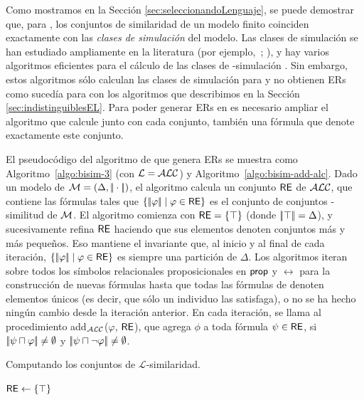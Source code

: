 Como mostramos en la Secci\'on \ref{sec:seleccionandoLenguaje}, se puede demostrar que, para \ALC, los conjuntos de similaridad de un modelo finito
coinciden exactamente con las \emph{clases de simulaci\'on} del modelo. Las
clases de simulaci\'on se han estudiado ampliamente en la literatura
(por ejemplo,~\cite{BRV01}; \cite {Kurt:expr99}), y hay varios
algoritmos eficientes para el c\'alculo de las clases de \alc-simulaci\'on
\cite{hopc:algo71,paig:thre87,dovier04:_effic_algor_for_comput_bisim_equiv}.
Sin embargo, estos algoritmos s\'olo calculan las clases de simulaci\'on para \alc y no obtienen ERs como suced\'ia para \EL con los algoritmos que describimos en la Secci\'on \ref{sec:indistinguiblesEL}. Para poder generar ERs en \alc es necesario ampliar el algoritmo \cite{hopc:algo71} que
calcule junto con cada conjunto, tambi\'en una f\'ormula que denote
exactamente este conjunto.
 
El pseudoc\'odigo del algoritmo de \ALC que genera ERs se muestra como
Algoritmo~\ref{algo:bisim-3} (con $\mathcal{L}=\mathcal{ALC}$) y
Algoritmo~\ref{algo:bisim-add-alc}. Dado un modelo de $\mathcal{M}=(\Delta,
|\!|\cdot|\!|)$, el algoritmo calcula un conjunto $\textsf{RE}$ de $\mathcal{ALC}$, que contiene las
f\'ormulas tales que $ \{|\!|\varphi|\!| \mid \varphi \in \textsf{RE} \} $ es el
conjunto de conjuntos \alc-similitud de $\mathcal{M}$. El algoritmo comienza con $ \textsf{RE}
= \{\top \} $ (donde $ |\!|\top|\!| = \Delta $), y sucesivamente refina
$\textsf{RE}$ haciendo que sus elementos denoten conjuntos m\'as y m\'as peque\~nos. Eso
mantiene el invariante que, al inicio y al final de cada iteraci\'on,
$\{|\!|\varphi|\!| \mid \varphi \in \textsf{RE}\}$ es siempre una partici\'on de
$ \Delta $. Los algoritmos iteran sobre todos los
s\'imbolos relacionales proposicionales en $ \mathsf{prop} $ y $\rel $ para la construcci\'on de nuevas f\'ormulas
hasta que todas las f\'ormulas de \RE denoten elementos \'unicos (es decir, que
s\'olo un individuo las satisfaga), o no se ha hecho ning\'un cambio desde la
 iteraci\'on anterior. En cada iteraci\'on, se llama al procedimiento
add$_\mathcal{ALC}$($ \varphi $, $\textsf{RE}$), que agrega $ \phi $ a toda
f\'ormula $\psi \in \textsf{RE} $, 
si $|\!|\psi \sqcap \varphi|\!| \not = \emptyset$ y $|\!|\psi \sqcap \neg \varphi|\!| \not = \emptyset$.

\begin{megaalgorithm}[H]%
\dontprintsemicolon

\caption{Computando los conjuntos de $\mathcal{L}$-similaridad.}
\label{algo:bisim-3}

$\textsf{RE} \leftarrow \{\top\}$


\end{megaalgorithm}


